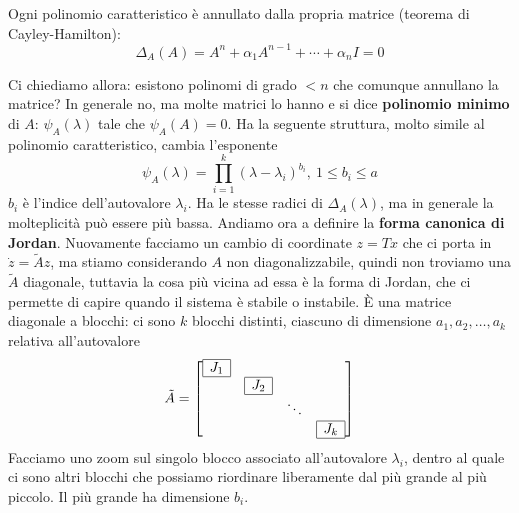 \documentclass[10pt,a4paper]{book}
\begin{document}
\begin{ricalg}
Ogni polinomio caratteristico è annullato dalla propria matrice (teorema di Cayley-Hamilton):\begin{equation*}
\Delta _A\left( A\right) =A^n +\alpha _1 A^{n-1} +\cdots +\alpha _n I=0
\end{equation*}
\end{ricalg}
Ci chiediamo allora: esistono polinomi di grado $< n$ che comunque annullano la matrice? In generale no, ma molte matrici lo hanno e si dice \textbf{polinomio minimo} di $A$: $\psi _A\left( \lambda \right)$ tale che $\psi _A\left( A\right) =0$. Ha la seguente struttura, molto simile al polinomio caratteristico, cambia l'esponente
\begin{equation}
\psi _A\left( \lambda \right) =\prod ^k_{i=1}\left( \lambda -\lambda _i\right)^{b_i} ,\ 1\leqslant b_i \leqslant a
\end{equation}
$b_i$ è l'indice dell'autovalore $\lambda _i$. Ha le stesse radici di $\Delta _A\left( \lambda \right)$, ma in generale la molteplicità può essere più bassa. Andiamo ora a definire la \textbf{forma canonica di Jordan}. Nuovamente facciamo un cambio di coordinate $z=Tx$ che ci porta in $\dot{z} =\tilde{A} z$, ma stiamo considerando $A$ non diagonalizzabile, quindi non troviamo una $\tilde{A}$ diagonale, tuttavia la cosa più vicina ad essa è la forma di Jordan, che ci permette di capire quando il sistema è stabile o instabile. È una matrice diagonale a blocchi: ci sono $k$ blocchi distinti, ciascuno di dimensione $a_1 ,a_2 ,\dotsc ,a_k$ relativa all'autovalore
\begin{equation*}
\tilde{A} =\begin{bmatrix}
\begin{array}{|c|}
\hline
J_1\\
\hline
\end{array} &  &  & \\
 & \begin{array}{|c|}
\hline
J_2\\
\hline
\end{array} &  & \\
 &  & \ddots  & \\
 &  &  & \begin{array}{|c|}
\hline
J_k\\
\hline
\end{array}
\end{bmatrix}
\end{equation*}
Facciamo uno zoom sul singolo blocco associato all'autovalore $\lambda _i$, dentro al quale ci sono altri blocchi che possiamo riordinare liberamente dal più grande al più piccolo. Il più grande ha dimensione $b_i$.
\end{document}
